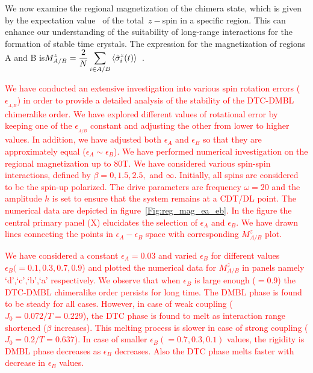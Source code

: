 \documentclass[12pt]{iopart}
\newcommand{\red}[1]{\textcolor{red}{#1}}
\begin{document}
We now examine the regional magnetization of the chimera state, which is given by the expectation value  of the total $z-$spin in a specific region. This can enhance our understanding of the suitability of long-range interactions for the formation of stable time crystals. The expression for the magnetization of regions A and B is$\displaystyle M^z_{A/B}=\frac{2}{N}\sum_{i\in{A/B}}\expval{\hat{\sigma}^z_i(t)}$~\cite{sakurai_phys_nodate}.

\red{We have conducted an extensive investigation into various spin rotation errors ($\epsilon_{_{A,B}}$) in order to provide a detailed analysis of the stability of the DTC-DMBL chimeralike order. We have explored different values of rotational error by keeping one of the $\epsilon_{_{A/B}}$ constant and adjusting the other from lower to higher values. In addition, we have adjusted both $\epsilon_A$ and $\epsilon_B$ so that they are approximately equal ($\epsilon_A \sim \epsilon_B$). We have performed  numerical investigation on the regional magnetization up to 80T. We have  considered various spin-spin interactions, defined by $\beta = 0,1.5,2.5,$ and $\infty$. Initially, all spins are considered to be the spin-up polarized. The drive parameters are frequency $\omega =20$ and the amplitude $h$ is set to ensure that the system remains at a CDT/DL point. The numerical data are depicted in figure~\ref{Fig:reg_mag_ea_eb}. In the figure the central primary panel (X) elucidates the selection of $\epsilon_A$ and $\epsilon_B$. We have drawn lines connecting the points in $\epsilon_A - \epsilon_B$ space with corresponding $M^z_{A/B}$ plot. }
	
\red{We have considered a constant $\epsilon_{A} =0.03$ and varied $\epsilon_B$ for different values $\epsilon_B(= 0.1, 0.3, 0.7,0.9$) and plotted the numerical data for $M^z_{A/B}$ in panels  namely `d',`c',`b',`a' respectively. We observe that when $\epsilon_B$ is large enough ($=0.9$) the DTC-DMBL chimeralike order persists for long time. The DMBL phase is found to be steady for all cases. However, in case of weak coupling ($J_0=0.072/T=0.229$), the DTC phase is found to melt as interaction range shortened ($\beta$ increases). This melting process is slower in case of strong coupling ($J_0=0.2/T=0.637$). In case of smaller $\epsilon_B (=0.7,0.3,0.1)$ values, the rigidity is DMBL phase decreases as $\epsilon_B$ decreases. Also the DTC phase melts faster with decrease in $\epsilon_B$ values.}
\end{document}
